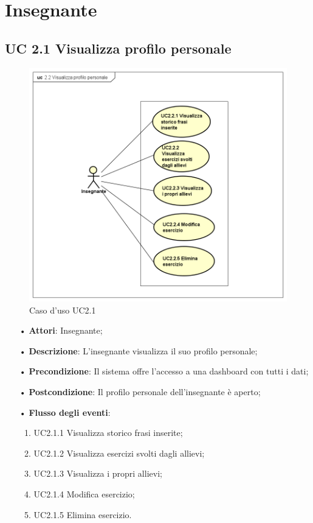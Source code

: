 
\section{Insegnante}
\subsection{UC 2.1 Visualizza profilo personale}

\begin{figure}[H]
\centering
\includegraphics[width=14cm]{img/UC21.png} 
\caption{Caso d'uso UC2.1}
\end{figure}

\begin{itemize}
	\item[•] \textbf{Attori}: Insegnante;
	\item[•] \textbf{Descrizione}: L’insegnante visualizza il suo profilo personale;

	\item[•] \textbf{Precondizione}: Il sistema offre l’accesso a una dashboard con tutti i dati;

	\item[•] \textbf{Postcondizione}:  Il profilo personale dell’insegnante è aperto;
	\item[•] \textbf{Flusso degli eventi}:
		\begin{enumerate}
			\item UC2.1.1 Visualizza storico frasi inserite;
			\item UC2.1.2 Visualizza esercizi svolti dagli allievi;
			\item UC2.1.3 Visualizza i propri allievi;
			\item UC2.1.4 Modifica esercizio;
			\item UC2.1.5 Elimina esercizio.
		\end{enumerate}
\end{itemize}

